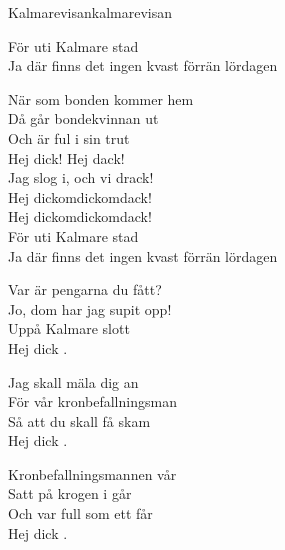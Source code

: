\begin{song}{Kalmarevisan}{kalmarevisan}
\begin{vers}
För uti Kalmare stad\\
Ja där finns det ingen kvast förrän lördagen\\
\end{vers}
\begin{vers}
\repopen När som bonden kommer hem\\
Då går bondekvinnan ut \repclose\\
Och är ful i sin trut\\
Hej dick! Hej dack!\\
Jag slog i, och vi drack!\\
Hej dickomdickomdack!\\
Hej dickomdickomdack!\\
För uti Kalmare stad\\
Ja där finns det ingen kvast förrän lördagen\\
\end{vers}
\begin{vers}
\repopen Var är pengarna du fått?\\
Jo, dom har jag supit opp! \repclose\\
Uppå Kalmare slott\\
Hej dick . \\
\end{vers}
\begin{vers}
\repopen Jag skall mäla dig an\\
För vår kronbefallningsman \repclose\\
Så att du skall få skam\\
Hej dick . \\
\end{vers}
\begin{vers}
\repopen Kronbefallningsmannen vår\\
Satt på krogen i går \repclose\\
Och var full som ett får\\
Hej dick . \\
\end{vers}
\end{song}
